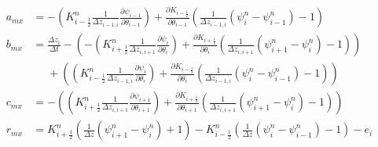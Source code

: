 \begin{equation}
\begin{aligned}
 a_{mx} &= -\left(K_{i-\frac{1}{2}}^{n} \frac{1}{\Delta z_{i-1, i}}
     \frac{\partial \psi_{i-1}}{\partial \theta_{i-1}}\right)+\frac{\partial K_{i-\frac{1}{2}}}
     {\partial \theta_{i-1}}\left(\frac{1}{\Delta z_{i-1, i}}\left(\psi_{i}^{n}-\psi_{i-1}^{n}\right)-1\right) \\
b_{mx} &= \frac{\Delta z_{i}}{\Delta t}-\left(-\left(K_{i+\frac{1}{2}}^{n} \frac{1}{\Delta z_{i, i+1}} 
      \frac{\partial \psi_{i}}{\partial \theta_{i}}\right)+\frac{\partial K_{i+\frac{1}{2}}}{\partial \theta_{i}}
      \left(\frac{1}{\Delta z_{i, i+1}}\left(\psi_{i+1}^{n}-\psi_{i}^{n}\right)-1\right)\right) \\
&\mathrel{\phantom{=}}+\left(\left(K_{i-\frac{1}{2}}^{n} \frac{1}{\Delta z_{i-1, i}} \frac{\partial \psi_{i}}{\partial 
       \theta_{i}}\right)+\frac{\partial K_{i-\frac{1}{2}}}{\partial \theta_{i}}\left(\frac{1}{\Delta z_{i-1, i}}\left(\psi_{i}^{n}-\psi_{i-1}^{n}\right)-1\right)\right) \\ 
c_{mx} &= -\left(\left(K_{i+\frac{1}{2}}^{n} \frac{1}{\Delta z_{i, i+1}} 
       \frac{\partial \psi_{i+1}}{\partial \theta_{i+1}}\right)+\frac{\partial K_{i+\frac{1}{2}}}{\partial \theta_{i+1}}\left(\frac{1}
       {\Delta z_{i, i+1}}\left(\psi_{i+1}^{n}-\psi_{i}^{n}\right)-1\right)\right) \\ 
r_{mx} &= K_{i+\frac{1}{2}}^{n}
       \left(\frac{1}{\Delta z}\left(\psi_{i+1}^{n}-\psi_{i}^{n}\right)+1\right)-K_{i-\frac{1}{2}}^{n}
       \left(\frac{1}{\Delta z}\left(\psi_{i}^{n}-\psi_{i-1}^{n}\right)-1\right)-e_{i}
\end{aligned}
\end{equation}

